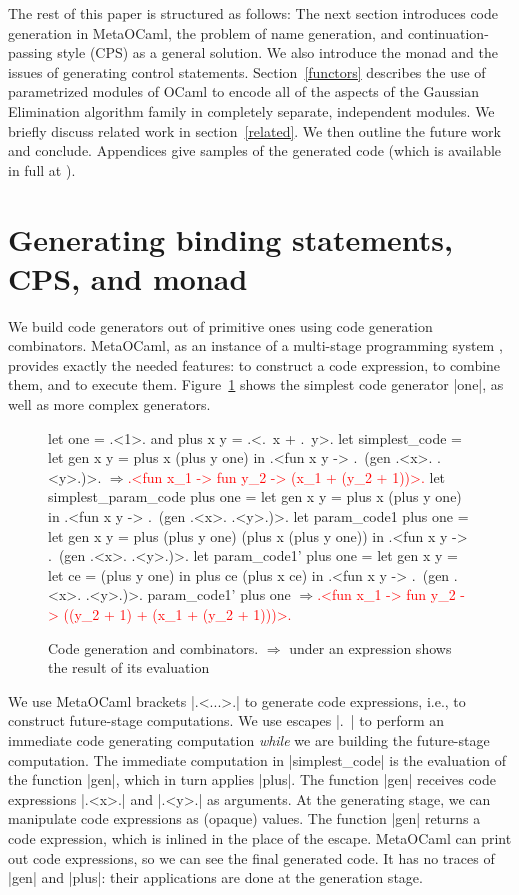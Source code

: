 \documentclass{llncs}
\newcommand{\evalresult}[1]{\ensuremath{\Longrightarrow}\textcolor{red}{#1}}
\begin{document}
The rest of this paper is structured as follows: The next section
introduces code generation in MetaOCaml, the problem of name
generation, and continuation-passing style (CPS) as a general
solution.  We also introduce the monad and the issues of generating
control statements. Section~\ref{functors} describes the use of
parametrized modules of OCaml to encode all of the aspects of the
Gaussian Elimination algorithm family in completely separate,
independent modules.  We briefly discuss related work in
section~\ref{related}. We then outline the future work and conclude.
Appendices give samples of the generated code (which is available in
full at \cite{metamonadsURL}).


\section{Generating binding statements, CPS, and monad}\label{CPS}

We build code generators out of primitive ones using code generation 
combinators. MetaOCaml, as an instance of a multi-stage
programming system \cite{TahaThesis}, provides exactly the needed
features: to construct a code expression, to combine them, and to
execute them. Figure~\ref{easycode} shows the simplest code generator |one|,
as well as more complex generators.

\begin{figure}
\begin{code}
let one = .<1>. and plus x y = .<.~x + .~y>.
let simplest_code = let gen x y = plus x (plus y one) in
  .<fun x y -> .~(gen .<x>. .<y>.)>.
\evalresult{.<fun x_1 -> fun y_2 -> (x_1 + (y_2 + 1))>.}
let simplest_param_code plus one = let gen x y = plus x (plus y one) in
  .<fun x y -> .~(gen .<x>. .<y>.)>.
let param_code1 plus one =
  let gen x y = plus (plus y one) (plus x (plus y one)) in
  .<fun x y -> .~(gen .<x>. .<y>.)>.
let param_code1' plus one =
  let gen x y = let ce = (plus y one) in  plus ce (plus x ce) in
  .<fun x y -> .~(gen .<x>. .<y>.)>.
param_code1' plus one
\evalresult{.<fun x_1 -> fun y_2 -> ((y_2 + 1) + (x_1 + (y_2 + 1)))>.}
\end{code}
\caption{Code generation and combinators. $\Longrightarrow$ under an
  expression shows the result of its evaluation}\label{easycode}
\end{figure}

We use MetaOCaml brackets |.<...>.| to generate code expressions,
i.e., to construct future-stage computations. We use escapes |.~| to
perform an immediate code generating computation \emph{while} we are
building the future-stage computation. The immediate computation in
|simplest_code| is the evaluation of the function |gen|, which in turn
applies |plus|. The function |gen| receives code expressions |.<x>.|
and |.<y>.| as arguments. At the generating stage, we can manipulate
code expressions as (opaque) values. The function |gen| returns a code
expression, which is inlined in the place of the escape. MetaOCaml can
print out code expressions, so we can see the final generated code. It
has no traces of |gen| and |plus|: their applications are done at the
generation stage.
\end{document}
